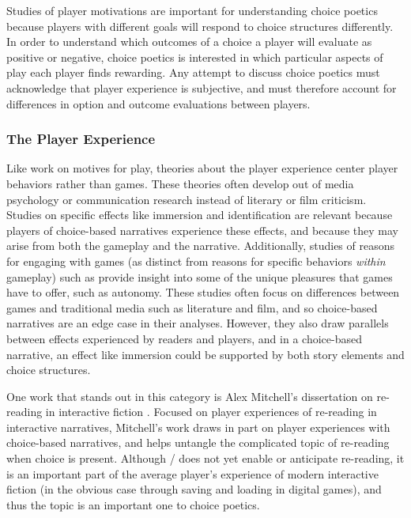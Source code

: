 Studies of player motivations are important for understanding choice poetics because players with different goals will respond to choice structures differently.
%
In order to understand which outcomes of a choice a player will evaluate as positive or negative, choice poetics is interested in which particular aspects of play each player finds rewarding.
%
Any attempt to discuss choice poetics must acknowledge that player experience is subjective, and must therefore account for differences in option and outcome evaluations between players.

\subsubsection{The Player Experience}

Like work on motives for play, theories about the player experience center player behaviors rather than games.
%
These theories often develop out of media psychology or communication research instead of literary or film criticism.
%
Studies on specific effects like immersion \citep{Douglas2001,Ermi2005} and identification \citep{Klimmt2009} are relevant because players of choice-based narratives experience these effects, and because they may arise from both the gameplay and the narrative.
%
Additionally, studies of reasons for engaging with games (as distinct from reasons for specific behaviors \emph{within} gameplay) such as \citep{Ryan2006,Olson2008} provide insight into some of the unique pleasures that games have to offer, such as autonomy.
%
These studies often focus on differences between games and traditional media such as literature and film, and so choice-based narratives are an edge case in their analyses.
%
However, they also draw parallels between effects experienced by readers and players, and in a choice-based narrative, an effect like immersion could be supported by both story elements and choice structures.


One work that stands out in this category is Alex Mitchell's dissertation on re-reading in interactive fiction \citep{Mitchell2012}.
%
Focused on player experiences of re-reading in interactive narratives, Mitchell's work draws in part on player experiences with choice-based narratives, and helps untangle the complicated topic of re-reading when choice is present.
%
Although \dunyazad/ does not yet enable or anticipate re-reading, it is an important part of the average player's experience of modern interactive fiction (in the obvious case through saving and loading in digital games), and thus the topic is an important one to choice poetics.

